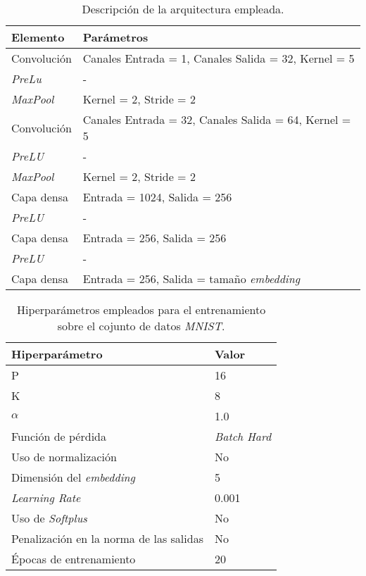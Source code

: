 \begin{table}[H]
\centering
\begin{tabular}{|l|l|}
    \hline
    Elemento & Parámetros \\
    \hline
    Convolución & Canales Entrada = 1, Canales Salida = 32, Kernel = 5 \\
    \textit{PreLu} & - \\
    \textit{MaxPool} & Kernel = 2, Stride = 2 \\
    Convolución & Canales Entrada = 32, Canales Salida = 64, Kernel = 5 \\
    \textit{PreLU} & - \\
    \textit{MaxPool} & Kernel = 2, Stride = 2 \\
    Capa densa & Entrada = 1024, Salida = 256 \\
    \textit{PreLU} & - \\
    Capa densa & Entrada = 256, Salida = 256 \\
    \textit{PreLU} & - \\
    Capa densa & Entrada = 256, Salida = tamaño \textit{embedding} \\
    \hline
\end{tabular}
\caption{Descripción de la arquitectura empleada.}
\label{table:arquitectura_mnist}
\end{table}

\begin{table}[!hbtp]
\centering
\begin{tabular}{|l|l|}
    \hline
    Hiperparámetro & Valor \\
    \hline

    P & 16 \\
    K & 8 \\
    $\alpha$ & 1.0 \\
    Función de pérdida & \textit{Batch Hard} \\
    Uso de normalización & No \\
    Dimensión del \textit{embedding} & 5 \\
    \textit{Learning Rate} & 0.001 \\
    Uso de \textit{Softplus} & No \\
    Penalización en la norma de las salidas & No \\
    Épocas de entrenamiento & 20 \\
    \hline
\end{tabular}
\caption{Hiperparámetros empleados para el entrenamiento sobre el cojunto de datos \textit{MNIST}.}
    \label{table:hiperparametros_mnist_mal}
\end{table}

